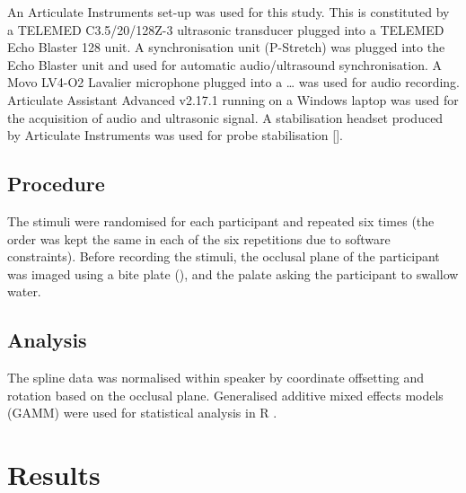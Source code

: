 \documentclass[]{elsarticle}
\begin{document}
An Articulate Instruments set-up was used for this study. This is
constituted by a TELEMED C3.5/20/128Z-3 ultrasonic transducer plugged
into a TELEMED Echo Blaster 128 unit. A synchronisation unit (P-Stretch)
was plugged into the Echo Blaster unit and used for automatic
audio/ultrasound synchronisation. A Movo LV4-O2 Lavalier microphone
plugged into a \ldots{} was used for audio recording. Articulate
Assistant Advanced v2.17.1 running on a Windows laptop was used for the
acquisition of audio and ultrasonic signal. A stabilisation headset
produced by Articulate Instruments was used for probe stabilisation
{[}{]}.

\subsection{Procedure}\label{procedure}

The stimuli were randomised for each participant and repeated six times
(the order was kept the same in each of the six repetitions due to
software constraints). Before recording the stimuli, the occlusal plane
of the participant was imaged using a bite plate (), and the palate
asking the participant to swallow water.

\subsection{Analysis}\label{analysis}

The spline data was normalised within speaker by coordinate offsetting
and rotation based on the occlusal plane. Generalised additive mixed
effects models (GAMM) were used for statistical analysis in R
\citep{r-core-team2017}.

\section{Results}\label{results}

\renewcommand\refname{Discussion}

\end{document}

